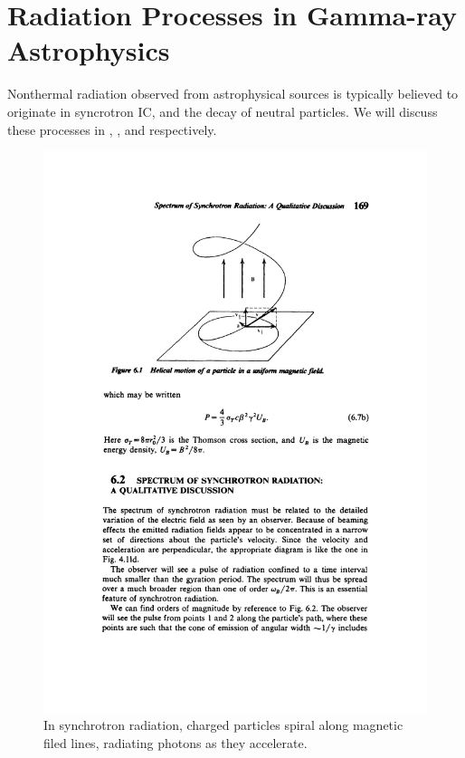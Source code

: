 \section{Radiation Processes in Gamma-ray Astrophysics}

Nonthermal radiation observed from astrophysical sources is
typically believed to originate in syncrotron \ac{IC}, and the
decay of neutral \pion particles.  We will discuss these processes
in , , and
 respectively.

\begin{figure}[htbp]
  \centering 
    \includegraphics{chapters/introduction/figures/syncrotron_radiation_spiral.pdf}
    \caption{In synchrotron radiation, charged particles spiral along
      magnetic filed lines, radiating photons as they accelerate.}
\end{figure}


